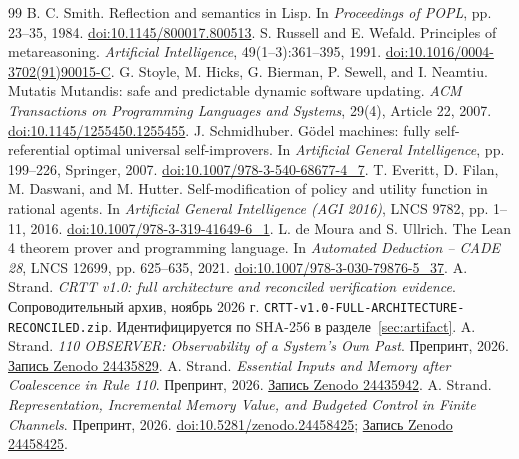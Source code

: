 \documentclass[10pt,a4paper]{article}
\begin{document}
\begin{thebibliography}{99}
 B. C. Smith. Reflection and semantics in Lisp. In \emph{Proceedings of POPL}, pp. 23--35, 1984. \href{https://doi.org/10.1145/800017.800513}{doi:10.1145/800017.800513}.
 S. Russell and E. Wefald. Principles of metareasoning. \emph{Artificial Intelligence}, 49(1--3):361--395, 1991. \href{https://doi.org/10.1016/0004-3702(91)90015-C}{doi:10.1016/0004-3702(91)90015-C}.
 G. Stoyle, M. Hicks, G. Bierman, P. Sewell, and I. Neamtiu. Mutatis Mutandis: safe and predictable dynamic software updating. \emph{ACM Transactions on Programming Languages and Systems}, 29(4), Article 22, 2007. \href{https://doi.org/10.1145/1255450.1255455}{doi:10.1145/1255450.1255455}.
 J. Schmidhuber. G\"odel machines: fully self-referential optimal universal self-improvers. In \emph{Artificial General Intelligence}, pp. 199--226, Springer, 2007. \href{https://doi.org/10.1007/978-3-540-68677-4_7}{doi:10.1007/978-3-540-68677-4\_7}.
 T. Everitt, D. Filan, M. Daswani, and M. Hutter. Self-modification of policy and utility function in rational agents. In \emph{Artificial General Intelligence (AGI 2016)}, LNCS 9782, pp. 1--11, 2016. \href{https://doi.org/10.1007/978-3-319-41649-6_1}{doi:10.1007/978-3-319-41649-6\_1}.
 L. de Moura and S. Ullrich. The Lean 4 theorem prover and programming language. In \emph{Automated Deduction -- CADE 28}, LNCS 12699, pp. 625--635, 2021. \href{https://doi.org/10.1007/978-3-030-79876-5_37}{doi:10.1007/978-3-030-79876-5\_37}.
 A. Strand. \emph{CRTT v1.0: full architecture and reconciled verification evidence}. Сопроводительный архив, ноябрь 2026 г. \texttt{CRTT-v1.0-FULL-ARCHITECTURE-RECONCILED.zip}. Идентифицируется по SHA-256 в разделе~\ref{sec:artifact}.
 A. Strand. \emph{110 OBSERVER: Observability of a System's Own Past}. Препринт, 2026. \href{https://zenodo.org/records/24435829}{Запись Zenodo 24435829}.
 A. Strand. \emph{Essential Inputs and Memory after Coalescence in Rule 110}. Препринт, 2026. \href{https://zenodo.org/records/24435942}{Запись Zenodo 24435942}.
 A. Strand. \emph{Representation, Incremental Memory Value, and Budgeted Control in Finite Channels}. Препринт, 2026. \href{https://doi.org/10.5281/zenodo.24458425}{doi:10.5281/zenodo.24458425}; \href{https://zenodo.org/records/24458425}{Запись Zenodo 24458425}.
\end{thebibliography}
\end{document}
